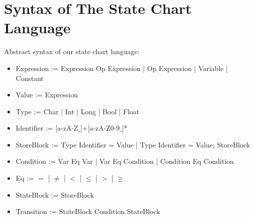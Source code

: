 \section{Syntax of The State Chart Language}

Abstract syntax of our state chart language:

\begin{itemize}
	\item Expression := Expression Op Expression $|$ Op Expression $|$ Variable $|$ Constant
	\item Value := Expression
	\item Type := Char | Int | Long | Bool | Float
	\item Identifier := [a-zA-Z$\_$]+[a-zA-Z0-9$\_$]*  
	
	\item StoreBlock := Type Identifier = Value | Type Identifier = Value; StoreBlock

	\item Condition := Var Eq Var | Var Eq Condition | Condition Eq Condition
	
	\item Eq := $=$ | $\neq$ | $<$ | $\leq$ | $>$ | $\geq$	

	\item StateBlock := StoreBlock	
	
	\item Transition := StateBlock Condition StateBlock
\end{itemize}

